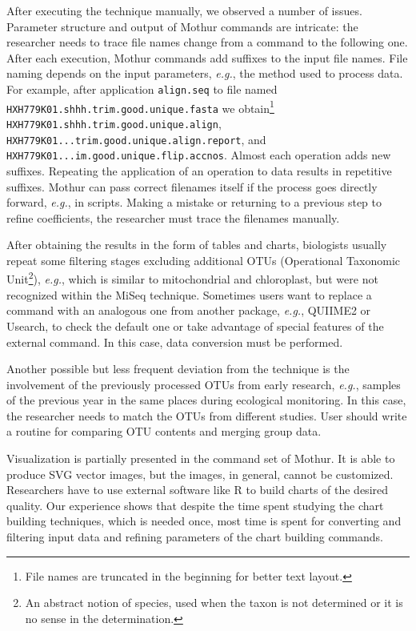 \documentclass[a4paper]{jpconf}
\begin{document}

After executing the technique manually, we observed a number of issues. Parameter structure and output of Mothur commands are intricate: the researcher needs to trace file names change from a command to the following one.  After each execution, Mothur commands add suffixes to the input file names.  File naming depends on the input parameters, \emph{e.g.}, the method used to process data. For example, after application \verb|align.seq| to file named \verb|HXH779K01.shhh.trim.good.unique.fasta| we obtain\footnote{File names are truncated in the beginning for better text layout.} \verb|HXH779K01.shhh.trim.good.unique.align|, \verb|HXH779K01...trim.good.unique.align.report|, and \verb|HXH779K01...im.good.unique.flip.accnos|.  Almost each operation adds new suffixes.  Repeating the application of an operation to data results in repetitive suffixes.  Mothur can pass correct filenames itself if the process goes directly forward, \emph{e.g.}, in scripts.  Making a mistake or returning to a previous step to refine coefficients, the researcher must trace the filenames manually.

After obtaining the results in the form of tables and charts, biologists usually repeat some filtering stages excluding additional OTUs (Operational Taxonomic Unit\footnote{An abstract notion of species, used when the taxon is not determined or it is no sense in the determination.}), \emph{e.g.}, which is similar to mitochondrial and chloroplast, but were not recognized within the MiSeq technique.
Sometimes users want to replace a command with an analogous one from another package, \emph{e.g.}, QUIIME2 or Usearch, to check the default one or take advantage of special features of the external command. In this case, data conversion must be performed.

Another possible but less frequent deviation from the technique is the involvement of the previously processed OTUs from early research, \emph{e.g.}, samples of the previous year in the same places during ecological monitoring. In this case, the researcher needs to match the OTUs from different studies. User should write a routine for comparing OTU contents and merging group data.

Visualization is partially presented in the command set of Mothur.  It is able to produce SVG vector images, but the images, in general, cannot be customized.  Researchers have to use external software like R to build charts of the desired quality.  Our experience shows that despite the time spent studying the chart building techniques, which is needed once, most time is spent for converting and filtering input data and refining parameters of the chart building commands.
\end{document}

